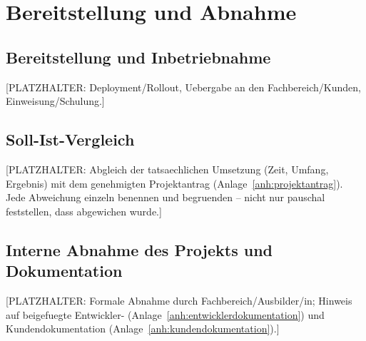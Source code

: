 \chapter{Bereitstellung und Abnahme}
\label{ch:bereitstellung_und_abnahme}

\section{Bereitstellung und Inbetriebnahme}
[PLATZHALTER: Deployment/Rollout, Uebergabe an den Fachbereich/Kunden,
Einweisung/Schulung.]

\section{Soll-Ist-Vergleich}
\label{sec:soll_ist_vergleich}
[PLATZHALTER: Abgleich der tatsaechlichen Umsetzung (Zeit, Umfang, Ergebnis)
mit dem genehmigten Projektantrag (Anlage~\ref{anh:projektantrag}). Jede
Abweichung einzeln benennen und begruenden -- nicht nur pauschal
feststellen, dass abgewichen wurde.]

\section{Interne Abnahme des Projekts und Dokumentation}
[PLATZHALTER: Formale Abnahme durch Fachbereich/Ausbilder/in; Hinweis auf
beigefuegte Entwickler- (Anlage~\ref{anh:entwicklerdokumentation}) und
Kundendokumentation (Anlage~\ref{anh:kundendokumentation}).]
